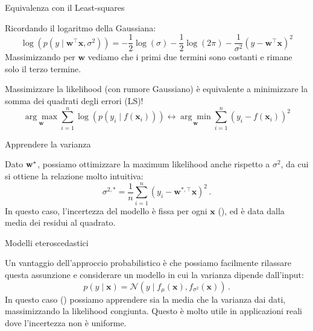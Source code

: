 \documentclass[12pt,aspectratio=169]{beamer}
\begin{document}
\begin{frame}{Equivalenza con il Least-squares}
	
	Ricordando il logaritmo della Gaussiana:
	\begin{equation}
		\log(p(y \mid \mathbf{w}^\top\mathbf{x}, \sigma^2)) = -\frac{1}{2}\log(\sigma) - \frac{1}{2}\log(2\pi) - \frac{1}{\sigma^2}(y - \mathbf{w}^\top\mathbf{x})^2
	\end{equation}
	Massimizzando per $\mathbf{w}$ vediamo che i primi due termini sono costanti e rimane solo il terzo termine.
	
	\begin{tcolorbox}
		Massimizzare la likelihood (con rumore Gaussiano) è equivalente a minimizzare la somma dei quadrati degli errori (LS)!
		\begin{equation}
			\underset{\mathbf{w}}{\arg\max} \sum_{i=1}^n \log\left(p(y_i \mid f(\mathbf{x}_i))\right) \longleftrightarrow \underset{\mathbf{w}}{\arg\min} \sum_{i=1}^n \left(y_i - f(\mathbf{x}_i)\right)^2
		\end{equation}
	\end{tcolorbox}
	
\end{frame}

\begin{frame}{Apprendere la varianza}
	
	Dato $\boldsymbol{\mathbf{w}}^*$, possiamo ottimizzare la maximum likelihood anche rispetto a $\sigma^2$, da cui si ottiene la relazione molto intuitiva:
	\begin{equation}
		\sigma^{2,*} = \frac{1}{n}\sum_{i=1}^n (y_i - \mathbf{w}^{*,\top}\mathbf{x})^2 \,.
	\end{equation}
	In questo caso, l'incertezza del modello è fissa per ogni $\mathbf{x}$ (), ed è data dalla media dei residui al quadrato.
	
\end{frame}

\begin{frame}{Modelli eteroscedastici}
	
	Un vantaggio dell'approccio probabilistico è che possiamo facilmente rilassare questa assunzione e considerare un modello in cui la varianza dipende dall'input:
	\begin{equation}
		p(y \mid \mathbf{x}) = \mathcal{N}(y \mid f_\mu(\mathbf{x}), f_{\sigma^2}(\mathbf{x})) \,.
	\end{equation}
	In questo caso () possiamo apprendere sia la media che la varianza dai dati, massimizzando la likelihood congiunta. Questo è molto utile in applicazioni reali dove l'incertezza non è uniforme.
	
\end{frame}
\end{document}
